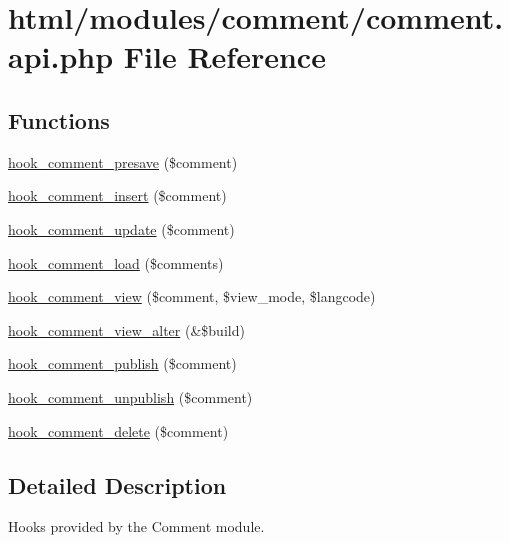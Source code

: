 \hypertarget{comment_8api_8php}{
\section{html/modules/comment/comment.api.php File Reference}
\label{comment_8api_8php}
}
\subsection*{Functions}
\begin{DoxyCompactItemize}
\item 
\hyperlink{group__hooks_gaaa06736884e98ef79711f70af9d1a266}{hook\_\-comment\_\-presave} (\$comment)
\item 
\hyperlink{group__hooks_ga3f972e92f09b1c9e8797fc9037e8c75d}{hook\_\-comment\_\-insert} (\$comment)
\item 
\hyperlink{group__hooks_ga63e0b41e7dbaadbf352b0a9c246d5ae5}{hook\_\-comment\_\-update} (\$comment)
\item 
\hyperlink{group__hooks_gafc29ce3a5bfc4778125ee3099850d96c}{hook\_\-comment\_\-load} (\$comments)
\item 
\hyperlink{group__hooks_gab162cbd3dc1b0395011df47ca3f98aa3}{hook\_\-comment\_\-view} (\$comment, \$view\_\-mode, \$langcode)
\item 
\hyperlink{group__hooks_ga092d794b204b6db107a5f763ac1be659}{hook\_\-comment\_\-view\_\-alter} (\&\$build)
\item 
\hyperlink{group__hooks_ga4c4be9019e5cc7f92e8ccc03b595a64b}{hook\_\-comment\_\-publish} (\$comment)
\item 
\hyperlink{group__hooks_gaed97e1a1eaedd7b482f881ea2b8a3876}{hook\_\-comment\_\-unpublish} (\$comment)
\item 
\hyperlink{group__hooks_gab8d94c5665313a2d174628cc219f0395}{hook\_\-comment\_\-delete} (\$comment)
\end{DoxyCompactItemize}


\subsection{Detailed Description}
Hooks provided by the Comment module. 